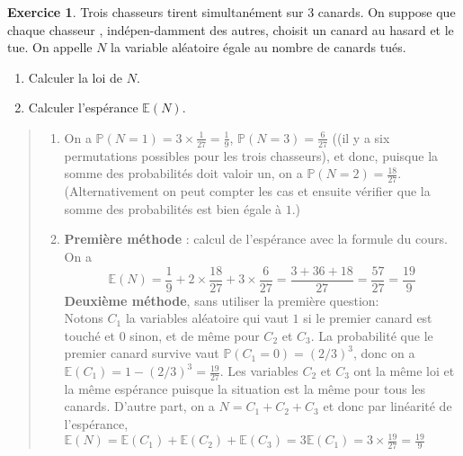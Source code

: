 \documentclass[11pt]{article}
\renewcommand{\P}{\mathbb P}
\newcommand{\E}{\mathbb E}
\theoremstyle{definition}
\newtheorem{exo}{Exercice}
\newenvironment{solution}{\begin{quote}\color{teal}}{\end{quote}}
\begin{document}
\begin{exo}
     Trois chasseurs tirent simultan\'ement sur 3 canards. On suppose que chaque chasseur , ind\'epen-damment des autres, choisit un canard au hasard et le tue.
     On appelle $N$ la variable al\'eatoire \'egale au nombre de canards tu\'es. 
     \begin{enumerate}
     \item Calculer la loi de $N$.
     \item Calculer l'espérance $\mathbb E(N)$.
     \end{enumerate}
     
     \begin{solution}
\begin{enumerate}
\item On a $\P(N=1)=3\times \frac{1}{27}=\frac{1}{9}$, $\P(N=3)=\frac{6}{27}$ ((il y a six permutations possibles pour les trois chasseurs), et donc, puisque la somme des probabilités doit valoir un, on a $\P(N=2)=\frac{18}{27}$. (Alternativement on peut compter les cas et ensuite vérifier que la somme des probabilités est bien égale à $1$.)
\item \textbf{Première méthode} : calcul de l'espérance avec la formule du cours. On a 
\[ \E(N) = \frac{1}{9}+2\times \frac{18}{27}+3\times\frac{6}{27} = \frac{3+36+18}{27} = \frac{57}{27}=\boxed{\frac{19}{9}}
\]
\textbf{Deuxième méthode}, sans utiliser la première question:\\
Notons $C_1$ la variables aléatoire qui vaut $1$ si le premier canard est touché et $0$ sinon, et de même pour $C_2$ et $C_3$. La probabilité que  le premier canard survive vaut $\P(C_1=0)=(2/3)^3$, donc on a $\E(C_1)=1-(2/3)^3=\frac{19}{27}$. Les variables $C_2$ et $C_3$ ont la même loi et la même espérance puisque la situation est la même pour tous les canards. D'autre part, on a  $N=C_1+C_2+C_3$ et donc par linéarité de l'espérance, 
$\E(N) = \E(C_1)+\E(C_2)+\E(C_3) = 3\E(C_1) =3\times \frac{19}{27} =\boxed{\frac{19}{9}}$
\end{enumerate}
\end{solution}
\end{exo}
\end{document}
